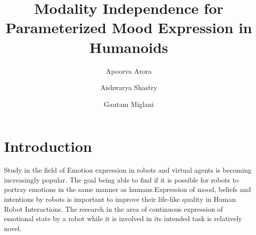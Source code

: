 \documentclass[runningheads]{llncs}
\begin{document}
%
\title{Modality Independence for Parameterized Mood Expression in Humanoids}
%
%
\author{Apoorva Arora \and
Aishwarya Shastry \and
Gautam Miglani}
%
%
%
\maketitle              %
%
\begin{abstract}

\end{abstract}
%
%
%
\section{Introduction}
Study in the field of Emotion expression in robots and virtual agents is becoming increasingly popular. The goal being able to find if it is possible for robots to portray emotions in the same manner as humans.Expression of mood, beliefs and intentions by robots is important to improve their life-like quality in Human Robot Interactions\cite{1}. The research in the area of continuous expression of emotional state by a robot while it is involved in its intended task is relatively novel.

\end{document}

